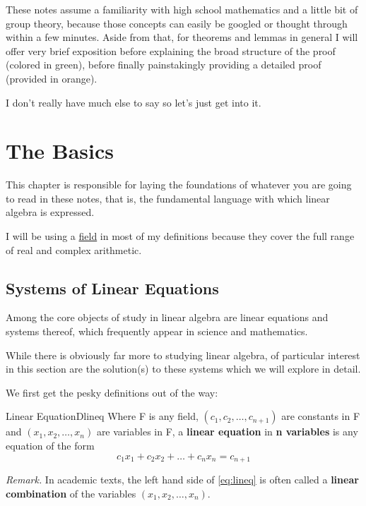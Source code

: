 \documentclass[oneside]{book}
\begin{document}
	These notes assume a familiarity with high school mathematics and a little bit of group theory, because those concepts can easily be googled or thought through within a few minutes. Aside from that, for theorems and lemmas in general I will offer very brief exposition before explaining the broad structure of the proof (colored in green), before finally painstakingly providing a detailed proof (provided in orange).
	
	I don't really have much else to say so let's just get into it.
	
	{
		\hypersetup{linkcolor=black}
		\tableofcontents
	}
	\chapter{The Basics}
	
	This chapter is responsible for laying the foundations of whatever you are going to read in these notes, that is, the fundamental language with which linear algebra is expressed. 
	
	I will be using a \href{https://simple.wikipedia.org/wiki/Field_(mathematics)}{field} in most of my definitions because they cover the full range of real and complex arithmetic.
	
	\section{Systems of Linear Equations}
	Among the core objects of study in linear algebra are linear equations and systems thereof, which frequently appear in science and mathematics.
	
	While there is obviously far more to studying linear algebra, of particular interest in this section are the solution(s) to these systems which we will explore in detail.
	
	We first get the pesky definitions out of the way:
	\begin{defn}{Linear Equation}{Dlineq}
		Where F is any field, $(c_1,c_2,\ldots,c_{n+1})$ are constants in F and $(x_1,x_2,\ldots,x_n)$ are variables in F, a \textbf{linear equation} in \textbf{n variables} is any equation of the form
		\begin{equation}
			\label{eq:lineq}
			c_1x_1+c_2x_2+\ldots+c_nx_n=c_{n+1}
		\end{equation}
	\end{defn}
	\textit{Remark.} In academic texts, the left hand side of \ref{eq:lineq} is often called a \textbf{linear combination} of the variables $(x_1,x_2,\ldots,x_n)$.
	
\end{document}
